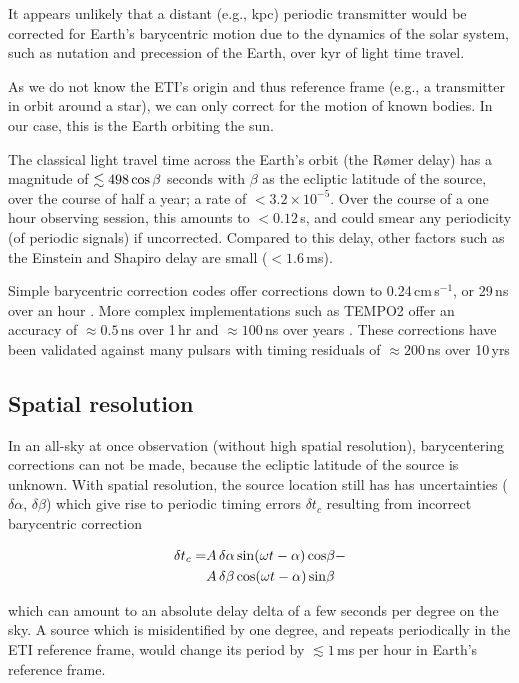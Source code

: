 \documentclass[twocolumn,tighten,longauthor]{myaastex62}
\begin{document}
It appears unlikely that a distant (e.g., kpc) periodic transmitter would be corrected for Earth's barycentric motion due to the dynamics of the solar system, such as nutation and precession of the Earth, over kyr of light time travel.

As we do not know the ETI's origin and thus reference frame (e.g., a transmitter in orbit around a star), we can only correct for the motion of known bodies. In our case, this is the Earth orbiting the sun.

The classical light travel time across the Earth's orbit (the R{\o}mer delay) has a magnitude of $\lesssim 498\,{\rm cos}\,\beta$ seconds with $\beta$ as the ecliptic latitude of the source, over the course of half a year; a rate of $<3.2\times10^{-5}$. Over the course of a one hour observing session, this amounts to $<0.12\,$s, and could smear any periodicity (of periodic signals) if uncorrected. Compared to this delay, other factors such as the Einstein and Shapiro delay are small ($<1.6\,$ms).

Simple barycentric correction codes offer corrections down to 0.24\,cm\,s$^{-1}$, or 29\,ns over an hour \citep{2014PASP..126..838W}. More complex implementations such as TEMPO2 \citep{2006MNRAS.369..655H} offer an accuracy of $\approx0.5\,$ns over 1\,hr and $\approx100\,$ns over years \citep{2006MNRAS.372.1549E}. These corrections have been validated against many pulsars with timing residuals of $\approx200$\,ns over 10\,yrs \citep{2010MNRAS.402.1027H}


\subsection{Spatial resolution}
\label{sub:periodicity}
In an all-sky at once observation (without high spatial resolution), barycentering corrections can not be made, because the ecliptic latitude of the source is unknown. With spatial resolution, the source location still has has uncertainties ($\delta \alpha$, $\delta \beta$) which give rise to periodic timing errors $\delta t_c$ resulting from incorrect barycentric correction \citep{lyne2006pulsar}

\begin{align}
    \delta t_c = &A\,\delta\alpha\,{\rm sin}(\omega t-\alpha)\, {\rm cos}\beta -\\
    &A\,\delta\beta\, {\rm cos}(\omega t-\alpha)\,{\rm sin} \beta \nonumber
\end{align}

which can amount to an absolute delay delta of a few seconds per degree on the sky. A source which is misidentified by one degree, and repeats periodically in the ETI reference frame, would change its period by $\lesssim 1\,$ms per hour in Earth's reference frame.
\end{document}
